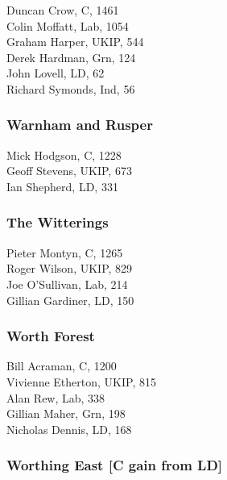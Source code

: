 \documentclass[a4paper,openany,10pt]{book}
\begin{document}


Duncan Crow, C, 1461\\
Colin Moffatt, Lab, 1054\\
Graham Harper, UKIP, 544\\
Derek Hardman, Grn, 124\\
John Lovell, LD, 62\\
Richard Symonds, Ind, 56\\


\subsubsection*{Warnham and Rusper}



Mick Hodgson, C, 1228\\
Geoff Stevens, UKIP, 673\\
Ian Shepherd, LD, 331\\


\subsubsection*{The Witterings}



Pieter Montyn, C, 1265\\
Roger Wilson, UKIP, 829\\
Joe O'Sullivan, Lab, 214\\
Gillian Gardiner, LD, 150\\


\subsubsection*{Worth Forest}



Bill Acraman, C, 1200\\
Vivienne Etherton, UKIP, 815\\
Alan Rew, Lab, 338\\
Gillian Maher, Grn, 198\\
Nicholas Dennis, LD, 168\\


\subsubsection*{Worthing East \hspace*{\fill}\nolinebreak[1]%
\enspace\hspace*{\fill}
[C gain from LD]}
\end{document}
